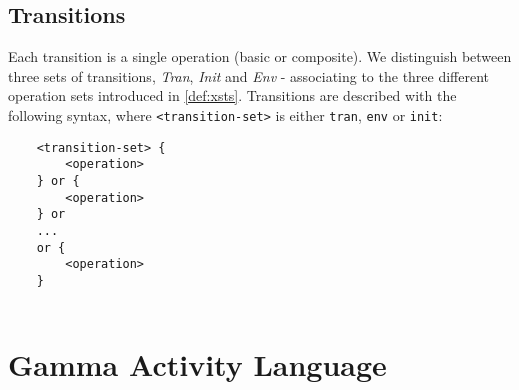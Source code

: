 \subsection{Transitions}

Each transition is a single operation (basic or composite). We distinguish between three sets of transitions, \emph{Tran}, \emph{Init} and \emph{Env} - associating to the three different operation sets introduced in \autoref{def:xsts}. Transitions are described with the following syntax, where \verb|<transition-set>| is either \verb|tran|, \verb|env| or \verb|init|:

\begin{Verbatim}
	<transition-set> {
		<operation>
	} or {
		<operation>
	} or
	...
	or {
		<operation>
	}
	
\end{Verbatim}

\clearpage\section{Gamma Activity Language}
